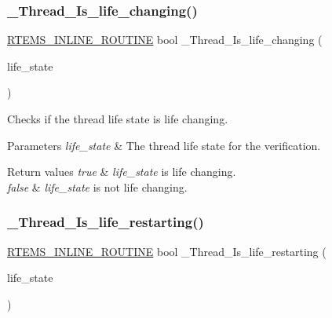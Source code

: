 \subsubsection{\texorpdfstring{\_Thread\_Is\_life\_changing()}{\_Thread\_Is\_life\_changing()}}
{\footnotesize\ttfamily \mbox{\hyperlink{group__RTEMSScoreBaseDefs_gac216239df231d5dbd15e3520b0b9313f}{R\+T\+E\+M\+S\+\_\+\+I\+N\+L\+I\+N\+E\+\_\+\+R\+O\+U\+T\+I\+NE}} bool \+\_\+\+Thread\+\_\+\+Is\+\_\+life\+\_\+changing (\begin{DoxyParamCaption}\item[{\mbox{\hyperlink{group__RTEMSScoreThread_ga0b4c61e432a0c21855e3122bb394583d}{Thread\+\_\+\+Life\+\_\+state}}}]{life\+\_\+state }\end{DoxyParamCaption})}



Checks if the thread life state is life changing. 


\begin{DoxyParams}{Parameters}
{\em life\+\_\+state} & The thread life state for the verification.\\
\hline
\end{DoxyParams}

\begin{DoxyRetVals}{Return values}
{\em true} & {\itshape life\+\_\+state} is life changing. \\
\hline
{\em false} & {\itshape life\+\_\+state} is not life changing. \\
\hline
\end{DoxyRetVals}
\mbox{\label{group__RTEMSScoreThread_ga02d81e4074320decb23de6713559e215}} 
\subsubsection{\texorpdfstring{\_Thread\_Is\_life\_restarting()}{\_Thread\_Is\_life\_restarting()}}
{\footnotesize\ttfamily \mbox{\hyperlink{group__RTEMSScoreBaseDefs_gac216239df231d5dbd15e3520b0b9313f}{R\+T\+E\+M\+S\+\_\+\+I\+N\+L\+I\+N\+E\+\_\+\+R\+O\+U\+T\+I\+NE}} bool \+\_\+\+Thread\+\_\+\+Is\+\_\+life\+\_\+restarting (\begin{DoxyParamCaption}\item[{\mbox{\hyperlink{group__RTEMSScoreThread_ga0b4c61e432a0c21855e3122bb394583d}{Thread\+\_\+\+Life\+\_\+state}}}]{life\+\_\+state }\end{DoxyParamCaption})}



